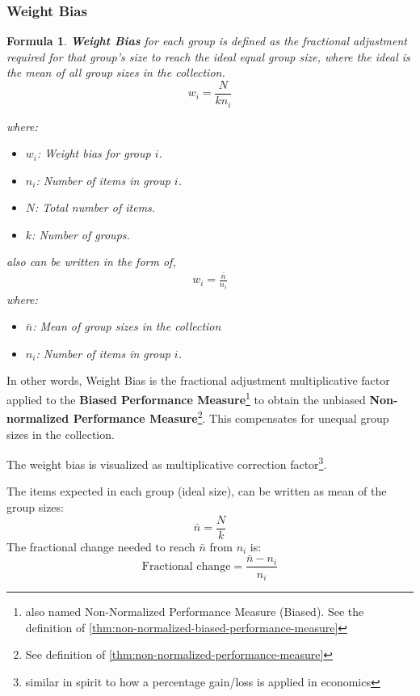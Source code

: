 \documentclass[a4paper,fleqn,review]{cas-sc}
\newtheorem{theorem}{Formula}
\begin{document}
\subsubsection{Weight Bias}
\begin{theorem}\label{thm:weight-bias}
	\textbf{Weight Bias}
	 for each group is defined as the fractional adjustment required for that group’s size to reach the ideal equal group size, where the ideal is the mean of all group sizes in the collection.
	\begin{equation}
		w_i = \frac{N}{kn_i}
		\label{eq:weight-bias}
	\end{equation}
	
	where:
	\begin{itemize}
		\item[] $w_i$: Weight bias for group $i$.
		\item[] $n_i$: Number of items in group $i$.
		\item[] $N$: Total number of items.
		\item[] $k$: Number of groups.
	\end{itemize}
	also can be written in the form of,
	\begin{align*}
		w_i = \frac{\bar{n}}{n_i}
	\end{align*}
	where:
	\begin{itemize}
		\item[] $\bar{n}$: Mean of group sizes in the collection
		\item[] $n_i$: Number of items in group $i$.
	\end{itemize}
\end{theorem}

In other words, Weight Bias is the fractional adjustment multiplicative factor applied to the \textbf{Biased Performance Measure}\footnote{also named Non-Normalized Performance Measure (Biased). See the definition of \autoref{thm:non-normalized-biased-performance-measure}} to obtain the unbiased \textbf{Non-normalized Performance Measure}\footnote{See definition of \autoref{thm:non-normalized-performance-measure}}. This compensates for unequal group sizes in the collection.

\begin{pot}[\ref{thm:weight-bias}]
	 The weight bias is visualized as multiplicative correction factor\footnote{similar in spirit to how a percentage gain/loss is applied in economics}.
\end{pot}

The items expected in each group (ideal size), can be written as mean of the group sizes:
\[
\bar{n} = \frac{N}{k}
\]
The fractional change needed to reach \(\bar{n}\) from \(n_i\) is:
\[
\text{Fractional change} = \frac{\bar{n} - n_i}{n_i}
\]
\end{document}
